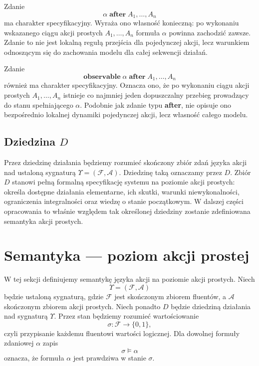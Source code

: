 \documentclass[11pt,a4paper]{article}
\theoremstyle{definition}
\begin{document}
Zdanie
\[
\alpha \;\textbf{after}\; A_1,\dots,A_n
\]
ma charakter specyfikacyjny. Wyraża ono własność konieczną: po wykonaniu wskazanego ciągu akcji prostych $A_1,\dots,A_n$ formuła $\alpha$ powinna zachodzić zawsze. Zdanie to nie jest lokalną regułą przejścia dla pojedynczej akcji, lecz warunkiem odnoszącym się do zachowania modelu dla całej sekwencji działań.

Zdanie
\[
\textbf{observable}\; \alpha \;\textbf{after}\; A_1,\dots,A_n
\]
również ma charakter specyfikacyjny. Oznacza ono, że po wykonaniu ciągu akcji prostych $A_1,\dots,A_n$ istnieje co najmniej jeden dopuszczalny przebieg prowadzący do stanu spełniającego $\alpha$. Podobnie jak zdanie typu \textbf{after}, nie opisuje ono bezpośrednio lokalnej dynamiki pojedynczej akcji, lecz własność całego modelu.

\subsection{Dziedzina \texorpdfstring{$D$}{D}}

Przez dziedzinę działania będziemy rozumieć skończony zbiór zdań języka akcji nad ustaloną sygnaturą $\Upsilon=(\mathcal{F},\mathcal{A})$. Dziedzinę taką oznaczamy przez $D$. Zbiór $D$ stanowi pełną formalną specyfikację systemu na poziomie akcji prostych: określa dostępne działania elementarne, ich skutki, warunki niewykonalności, ograniczenia integralności oraz wiedzę o stanie początkowym. W dalszej części opracowania to właśnie względem tak określonej dziedziny zostanie zdefiniowana semantyka akcji prostych.

\section{Semantyka --- poziom akcji prostej}
\label{sec:akcje-proste}

W tej sekcji definiujemy semantykę języka akcji na poziomie akcji prostych. Niech
\[
\Upsilon = (\mathcal{F},\mathcal{A})
\]
będzie ustaloną sygnaturą, gdzie $\mathcal{F}$ jest skończonym zbiorem fluentów, a $\mathcal{A}$ skończonym zbiorem akcji prostych. Niech ponadto $D$ będzie dziedziną działania nad sygnaturą $\Upsilon$. Przez stan będziemy rozumieć wartościowanie
\[
\sigma : \mathcal{F} \to \{0,1\},
\]
czyli przypisanie każdemu fluentowi wartości logicznej. Dla dowolnej formuły zdaniowej $\alpha$ zapis
\[
\sigma \models \alpha
\]
oznacza, że formuła $\alpha$ jest prawdziwa w stanie $\sigma$.
\end{document}
